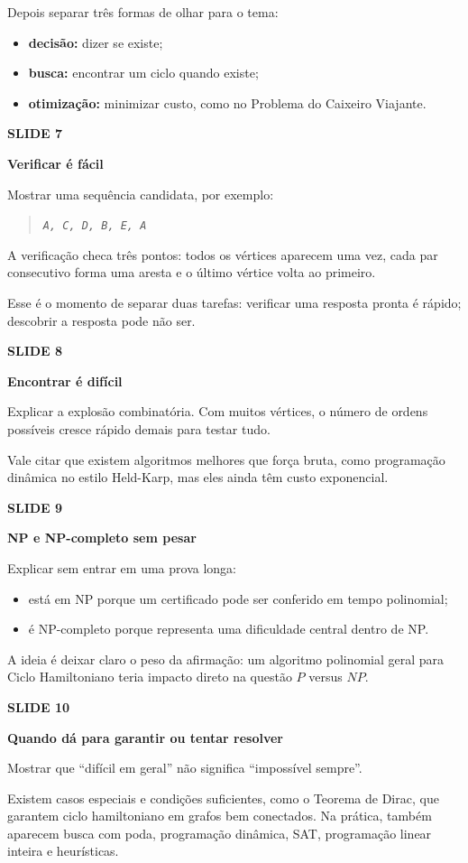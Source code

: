 \documentclass[11pt,a4paper]{article}
\newcommand{\slide}[2]{%
  \vspace{0.9em}
  {\small\bfseries\color{muted}SLIDE #1}\par
  {\large\bfseries #2}\par
  \vspace{-0.3em}
}
\newcommand{\question}[1]{%
  \begin{quote}
    \itshape #1
  \end{quote}
}
\begin{document}
Depois separar três formas de olhar para o tema:

\begin{itemize}
  \item \textbf{decisão:} dizer se existe;
  \item \textbf{busca:} encontrar um ciclo quando existe;
  \item \textbf{otimização:} minimizar custo, como no Problema do Caixeiro Viajante.
\end{itemize}

\slide{7}{Verificar é fácil}

Mostrar uma sequência candidata, por exemplo:

\question{\texttt{A, C, D, B, E, A}}

A verificação checa três pontos: todos os vértices aparecem uma vez, cada par consecutivo forma uma aresta e o último vértice volta ao primeiro.

Esse é o momento de separar duas tarefas: verificar uma resposta pronta é rápido; descobrir a resposta pode não ser.

\slide{8}{Encontrar é difícil}

Explicar a explosão combinatória. Com muitos vértices, o número de ordens possíveis cresce rápido demais para testar tudo.

Vale citar que existem algoritmos melhores que força bruta, como programação dinâmica no estilo Held-Karp, mas eles ainda têm custo exponencial.

\slide{9}{NP e NP-completo sem pesar}

Explicar sem entrar em uma prova longa:

\begin{itemize}
  \item está em NP porque um certificado pode ser conferido em tempo polinomial;
  \item é NP-completo porque representa uma dificuldade central dentro de NP.
\end{itemize}

A ideia é deixar claro o peso da afirmação: um algoritmo polinomial geral para Ciclo Hamiltoniano teria impacto direto na questão $P$ versus $NP$.

\slide{10}{Quando dá para garantir ou tentar resolver}

Mostrar que ``difícil em geral'' não significa ``impossível sempre''.

Existem casos especiais e condições suficientes, como o Teorema de Dirac, que garantem ciclo hamiltoniano em grafos bem conectados. Na prática, também aparecem busca com poda, programação dinâmica, SAT, programação linear inteira e heurísticas.
\end{document}
